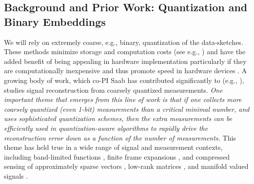\subsection{Background and Prior Work: Quantization and Binary Embeddings}\label{sec:quant}
We will rely on extremely
coarse, e.g., binary, quantization of the data-sketches. These methods minimize storage and computation costs (see e.g., \cite{fang2014sparse,boufounos20081}) and have the added benefit of being appealing in hardware implementation particularly if they are computationally inexpensive and thus promote speed in hardware devices  \cite{jacques2013robust,le2005analog}. A growing body of work, which co-PI Saab has contributed significantly to (e.g., \cite{SaabIEEEIT,knudson2016one,saab2018quantization,LybrandSaab2018,iwen2019new, daubechies2015deterministic}), studies signal reconstruction from coarsely quantized measurements. \emph{One important theme that emerges from this line of work  is that if one collects more coarsely quantized (even 1-bit) measurements  than a critical minimal number, and uses sophisticated quantization schemes, then the extra measurements can be efficiently used in quantization-aware algorithms to rapidly drive the reconstruction error down as a function of the number of measurements.} This theme has held true in a wide range of signal and measurement contexts, including band-limited functions \cite{daubechies2015deterministic}, finite frame expansions \cite{iwen2013near},  and compressed sensing of approximately sparse vectors \cite{SaabIEEEIT, saab2018quantization}, low-rank matrices \cite{LybrandSaab2018}, and manifold valued signals \cite{iwen2019new}.

